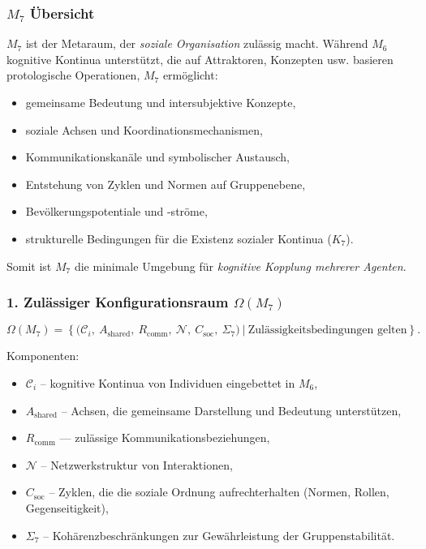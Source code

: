 

\subsubsection{\texorpdfstring{$M_7$}{M_7} Übersicht}
\label{sec:m7-overview}

$M_7$ ist der Metaraum, der \emph{soziale Organisation} zulässig macht.
Während $M_6$ kognitive Kontinua unterstützt, die auf Attraktoren, Konzepten usw. basieren
protologische Operationen, $M_7$ ermöglicht:

\begin{itemize}
    \item gemeinsame Bedeutung und intersubjektive Konzepte,
    \item soziale Achsen und Koordinationsmechanismen,
    \item Kommunikationskanäle und symbolischer Austausch,
    \item Entstehung von Zyklen und Normen auf Gruppenebene,
    \item Bevölkerungspotentiale und -ströme,
    \item strukturelle Bedingungen für die Existenz sozialer Kontinua ($K_7$).
\end{itemize}

Somit ist $M_7$ die minimale Umgebung für \emph{kognitive Kopplung mehrerer Agenten}.

\subsubsection*{1. Zulässiger Konfigurationsraum \texorpdfstring{$\Omega(M_7)$}{\Omega(M_7)}}

\[
\Omega(M_7)=
\left\{
\big(
\mathcal{C}_i,\
A_{\mathrm{shared}},\
R_{\mathrm{comm}},\
\mathcal{N},\
C_{\mathrm{soc}},\
\Sigma_7
\Big)
\ \big| \ \text{Zulässigkeitsbedingungen gelten}
\right\}.
\]

Komponenten:

\begin{itemize}
    \item $\mathcal{C}_i$ – kognitive Kontinua von Individuen eingebettet in $M_6$,
    \item $A_{\mathrm{shared}}$ – Achsen, die gemeinsame Darstellung und Bedeutung unterstützen,
    \item $R_{\mathrm{comm}}$ — zulässige Kommunikationsbeziehungen,
    \item $\mathcal{N}$ – Netzwerkstruktur von Interaktionen,
    \item $C_{\mathrm{soc}}$ – Zyklen, die die soziale Ordnung aufrechterhalten (Normen, Rollen, Gegenseitigkeit),
    \item $\Sigma_7$ – Kohärenzbeschränkungen zur Gewährleistung der Gruppenstabilität.
\end{itemize}

